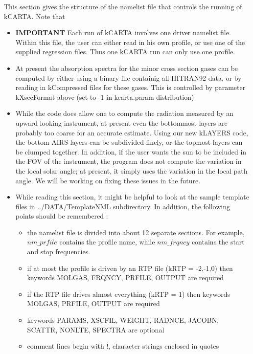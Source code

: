 \documentclass[12pt]{article}
\newcommand{\kc}{\textsf{kCARTA}\xspace}
\begin{document}
This section gives the structure of the namelist file that controls the 
running of \kc.  Note that 
\begin{itemize}
\item {\bf IMPORTANT} Each run of \kc involves one driver namelist file.
  Within this file, the user can either read in his own profile, or
  use one of the supplied regression files.  Thus one \kc run can only
  use one profile.
\item At present the absorption spectra for the minor cross section gases can
  be computed by either using a binary file containig all HITRAN92 data, or by
  reading in kCompressed files for these gases. This is controlled by
  parameter kXsecFormat above (set to -1 in kcarta.param distribution)
\item While the code does allow one to compute the radiation measured
  by an upward looking instrument, at present even the bottommost
  layers are probably too coarse for an accurate estimate. Using our new 
  kLAYERS code, the bottom AIRS layers can be subdivided finely, or the 
  topmost layers can be clumped together. In
  addition, if the user wants the sun to be included in the FOV of the
  instrument, the program does not compute the variation in the local
  solar angle; at present, it simply uses the variation in the local
  path angle.  We will be working on fixing these issues in the future.
\item While reading this section, it might be helpful to look at the
  sample template files in {\sf ../DATA/TemplateNML} subdirectory.  In
  addition, the following points should be remembered :
   \begin{itemize}
   \item the namelist file is divided into about 12 separate sections. For
      example, $nm\_prfile$ contains the profile name, while 
      $nm\_frqncy$ contains the start and stop frequencies.
   \item if at most the profile is driven by an RTP file (kRTP = -2,-1,0) then 
         keywords MOLGAS, FRQNCY, PRFILE, OUTPUT are required  
   \item if the RTP file drives almost everything (kRTP = 1) then 
         keywords MOLGAS, PRFILE, OUTPUT are required  
  \item keywords PARAMS, XSCFIL, WEIGHT, RADNCE, JACOBN, SCATTR, NONLTE, 
        SPECTRA are optional 
   \item comment lines begin with !, character strings enclosed in quotes
   \end{itemize}

\end{itemize}
\end{document}

